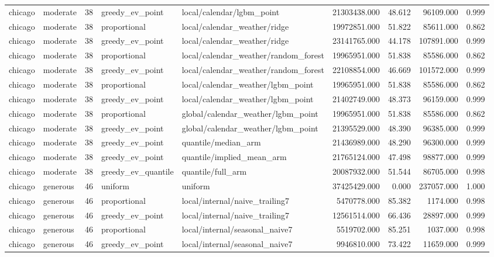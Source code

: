 \begin{tabular}{llrllrrrr}
chicago & moderate & 38 & greedy\_ev\_point & local/calendar/lgbm\_point & 21303438.000 & 48.612 & 96109.000 & 0.999 \\
chicago & moderate & 38 & proportional & local/calendar\_weather/ridge & 19972851.000 & 51.822 & 85611.000 & 0.862 \\
chicago & moderate & 38 & greedy\_ev\_point & local/calendar\_weather/ridge & 23141765.000 & 44.178 & 107891.000 & 0.999 \\
chicago & moderate & 38 & proportional & local/calendar\_weather/random\_forest & 19965951.000 & 51.838 & 85586.000 & 0.862 \\
chicago & moderate & 38 & greedy\_ev\_point & local/calendar\_weather/random\_forest & 22108854.000 & 46.669 & 101572.000 & 0.999 \\
chicago & moderate & 38 & proportional & local/calendar\_weather/lgbm\_point & 19965951.000 & 51.838 & 85586.000 & 0.862 \\
chicago & moderate & 38 & greedy\_ev\_point & local/calendar\_weather/lgbm\_point & 21402749.000 & 48.373 & 96159.000 & 0.999 \\
chicago & moderate & 38 & proportional & global/calendar\_weather/lgbm\_point & 19965951.000 & 51.838 & 85586.000 & 0.862 \\
chicago & moderate & 38 & greedy\_ev\_point & global/calendar\_weather/lgbm\_point & 21395529.000 & 48.390 & 96385.000 & 0.999 \\
chicago & moderate & 38 & greedy\_ev\_point & quantile/median\_arm & 21436989.000 & 48.290 & 96300.000 & 0.999 \\
chicago & moderate & 38 & greedy\_ev\_point & quantile/implied\_mean\_arm & 21765124.000 & 47.498 & 98877.000 & 0.999 \\
chicago & moderate & 38 & greedy\_ev\_quantile & quantile/full\_arm & 20087932.000 & 51.544 & 86705.000 & 0.998 \\
chicago & generous & 46 & uniform & uniform & 37425429.000 & 0.000 & 237057.000 & 1.000 \\
chicago & generous & 46 & proportional & local/internal/naive\_trailing7 & 5470778.000 & 85.382 & 1174.000 & 0.998 \\
chicago & generous & 46 & greedy\_ev\_point & local/internal/naive\_trailing7 & 12561514.000 & 66.436 & 28897.000 & 0.999 \\
chicago & generous & 46 & proportional & local/internal/seasonal\_naive7 & 5519702.000 & 85.251 & 1037.000 & 0.998 \\
chicago & generous & 46 & greedy\_ev\_point & local/internal/seasonal\_naive7 & 9946810.000 & 73.422 & 11659.000 & 0.999 \\

\end{tabular}

